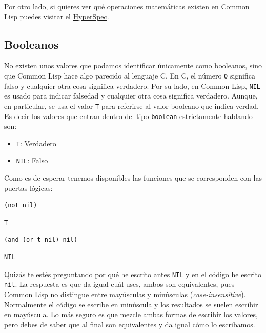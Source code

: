\documentclass[11pt]{article}
\begin{document}
Por otro lado, si quieres ver qué operaciones matemáticas existen en Common Lisp puedes visitar el \href{http://clhs.lisp.se/Body/12\_aa.htm}{HyperSpec}.


\subsection{Booleanos}
\label{sec:org140a2e2}

No existen unos valores que podamos identificar únicamente como booleanos, sino que Common Lisp hace algo parecido al lenguaje C. En C, el número \texttt{0} significa falso y cualquier otra cosa significa verdadero. Por su lado, en Common Lisp, \texttt{NIL} es usado para indicar falsedad y cualquier otra cosa significa verdadero. Aunque, en particular, se usa el valor \texttt{T} para referirse al valor booleano que indica verdad. Es decir los valores que entran dentro del tipo \texttt{boolean} estrictamente hablando son:

\begin{itemize}
\item \texttt{T}: Verdadero
\item \texttt{NIL}: Falso
\end{itemize}

Como es de esperar tenemos disponibles las funciones que se corresponden con las puertas lógicas:

\begin{verbatim}
(not nil)
\end{verbatim}

\begin{verbatim}
T
\end{verbatim}


\begin{verbatim}
(and (or t nil) nil)
\end{verbatim}

\begin{verbatim}
NIL
\end{verbatim}


Quizás te estés preguntando por qué he escrito antes \texttt{NIL} y en el código he escrito \texttt{nil}. La respuesta es que da igual cuál uses, ambos son equivalentes, pues Common Lisp no distingue entre mayúsculas y minúsculas (\emph{case-insensitive}). Normalmente el código se escribe en minúscula y los resultados se suelen escribir en mayúscula. Lo más seguro es que mezcle ambas formas de escribir los valores, pero debes de saber que al final son equivalentes y da igual cómo lo escribamos.
\end{document}
